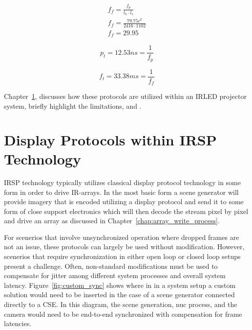     \begin{equation}
        \begin{array}{ l }
            f_f={\frac{f_p}{l_h \cdot l_v}} \\
            f_f={\frac{79.75e^6}{2416 \cdot 1102}} \\
            f_f={29.95}
            \label{eq:f_f_solve}
        \end{array}
    \end{equation}

    \begin{equation}
        p_t=12.53ns={\frac{1}{f_p}}
        \label{eq:p_t_solve}
    \end{equation}

    \begin{equation}
        f_t=33.38ms={\frac{1}{f_f}}
        \label{eq:f_t_solve}
    \end{equation}

    Chapter~\ref{sec:displays_within_proj_system}, discusses how these protocols are utilized within an IRLED projector system, briefly highlight the limitations, and . %

\section{Display Protocols within IRSP Technology}
    \label{sec:displays_within_proj_system}
    IRSP technology typically utilizes classical display protocol technology in some form in order to drive IR-arrays. In the most basic form a scene generator will provide imagery that is encoded utilizing a display protocol and send it to some form of close support electronics which will then decode the stream pixel by pixel and drive an array as discussed in Chapter~\ref{chap:array_write_process}.

    For scenerios that involve unsynchronized operation where dropped frames are not an issue, these protocols can largely be used without modification. However, scenerios that require synchronization in either open loop or closed loop setups present a challenge. Often, non-standard modifications must be used to compensate for jitter among different system processes and overall system latency. Figure~\ref{fig:custom_sync} shows where in in a system setup a custom solution would need to be inserted in the case of a scene generator connected directly to a CSE. In this diagram, the scene generation, nuc process, and the camera would need to be end-to-end synchronized with compensation for frame latencies.

